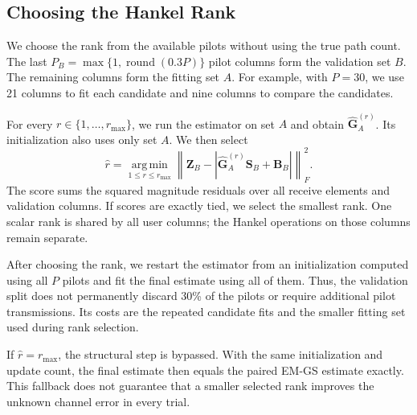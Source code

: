 \subsection{Choosing the Hankel Rank}
\label{sec:revised-rank-selection}

We choose the rank from the available pilots without using the true path
count. The last $P_B=\max\{1,\operatorname{round}(0.3P)\}$ pilot columns
form the validation set $B$. The remaining columns form the fitting set
$A$. For example, with $P=30$, we use 21 columns to fit each candidate and
nine columns to compare the candidates.

For every $r\in\{1,\ldots,r_{\max}\}$, we run the estimator on set $A$
and obtain $\widehat{\mathbf G}^{(r)}_A$. Its initialization also uses only
set $A$. We then select
\begin{equation}
\widehat r=\operatorname*{arg\,min}_{1\leq r\leq r_{\max}}
\left\|\mathbf Z_B-
 \left|\widehat{\mathbf G}^{(r)}_A\mathbf S_B+\mathbf B_B\right|
\right\|_F^2.
\label{eq:revision-rank-selection}
\end{equation}
The score sums the squared magnitude residuals over all receive elements
and validation columns. If scores are exactly tied, we select the smallest
rank. One scalar rank is shared by all user columns; the Hankel operations
on those columns remain separate.

After choosing the rank, we restart the estimator from an initialization
computed using all $P$ pilots and fit the final estimate using all of them.
Thus, the validation split does not permanently discard 30\% of the pilots
or require additional pilot transmissions. Its costs are the repeated
candidate fits and the smaller fitting set used during rank selection.

If $\widehat r=r_{\max}$, the structural step is bypassed. With the same
initialization and update count, the final estimate then equals the paired
EM-GS estimate exactly. This fallback does not guarantee that a smaller
selected rank improves the unknown channel error in every trial.

